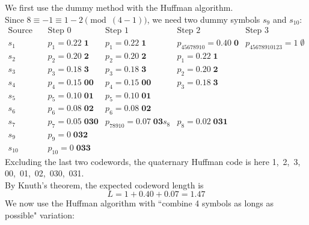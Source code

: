 \documentclass[11pt]{article}
\begin{document}
\bigskip
{}
We first use the dummy method with the Huffman algorithm.\\
Since $8\equiv -1\equiv 1-2\pmod{(4-1)}$, we need two dummy symbols $s_9$ and $s_{10}$:
\[\begin{array}{cllll}
 \text{Source symbols}& \text{Step 0}               & \text{Step 1}                        & \text{Step 2}                          & \text{Step 3}\\[1mm]
         s_1          & p_1    = 0.22\;\mathbf{  1} & p_1       = 0.22\;\mathbf{ 1}        & p_{45678910} = 0.40\;\mathbf{0}        & p_{45678910123} = 1\;\mathbf{\emptyset}\\[1mm]
         s_2          & p_2    = 0.20\;\mathbf{  2} & p_2       = 0.20\;\mathbf{ 2}        & p_1          = 0.22\;\mathbf{1}\\[1mm]
         s_3          & p_3    = 0.18\;\mathbf{  3} & p_3       = 0.18\;\mathbf{ 3}        & p_2          = 0.20\;\mathbf{2}\\[1mm]
         s_4          & p_4    = 0.15\;\mathbf{ 00} & p_4       = 0.15\;\mathbf{00}        & p_3          = 0.18\;\mathbf{3}\\[1mm]
         s_5          & p_5    = 0.10\;\mathbf{ 01} & p_5       = 0.10\;\mathbf{01}\\[1mm]
         s_6          & p_6    = 0.08\;\mathbf{ 02} & p_6       = 0.08\;\mathbf{02}\\[1mm]
         s_7          & p_7    = 0.05\;\mathbf{030} & p_{78910} = 0.07\;\mathbf{03}
         s_8          & p_8    = 0.02\;\mathbf{031}\\[1mm]
         s_9          & p_9    = 0   \;\mathbf{032}\\[1mm]
         s_{10}       & p_{10} = 0   \;\mathbf{033}
\end{array}\]
Excluding the last two codewords, the quaternary Huffman code is here 1,\, 2,\, 3,\, 00,\, 01,\, 02,\, 030,\, 031.\\
By Knuth's theorem,
the expected codeword length is
\[
  L = 1 + 0.40 + 0.07 = 1.47
\]
We now use the Huffman algorithm with ``combine 4 symbols as longs as possible" variation:
\end{document}
